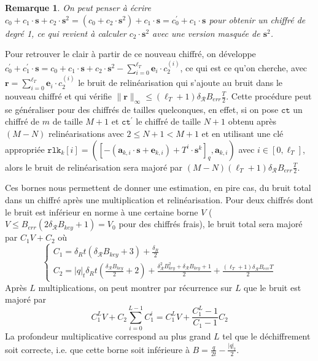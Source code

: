 \documentclass[11pt, headsepline, a4paper, fleqn, oneside]{article}
\newtheorem{rem}{Remarque}
\begin{document}
\begin{rem}
On peut penser à écrire $c_0 +c_1 \cdot\boldsymbol{s} + c_2 \cdot\boldsymbol{s}^2= (c_0 + c_2 \cdot\boldsymbol{s}^2) +c_1 \cdot\boldsymbol{s} = c_0 ^\prime +c_1 \cdot\boldsymbol{s}$ pour obtenir un chiffré de degré 1, ce qui revient à calculer $c_2 \cdot\boldsymbol{s}^2$ avec une version masquée de $\boldsymbol{s}^2$.
\end{rem}
Pour retrouver le clair à partir de ce nouveau chiffré, on développe $c_0 ^\prime + c_1 ^\prime \cdot\boldsymbol{s} = c_0 +c_1 \cdot\boldsymbol{s} + c_2 \cdot\boldsymbol{s}^2 - \sum_{i=0}^{\ell_T} \mathbf{e}_{i}\cdot c_2 ^{(i)}$, ce qui est ce qu'on cherche, avec $\boldsymbol{r} = \sum_{i=0}^{\ell_T} \mathbf{e}_{i}\cdot c_2 ^{(i)}$ le bruit de relinéarisation qui s'ajoute au bruit dans le nouveau chiffré et qui vérifie $\|\boldsymbol{r}\|_{\infty} \leq (\ell_T +1)\delta_\mathcal{R} B_{err}\frac{T}{2}$. Cette procédure peut se généraliser pour des chiffrés de tailles quelconques, en effet, si on pose $\texttt{ct}$ un chiffré de $m$ de taille $M+1$ et $\texttt{ct}^\prime$ le chiffré de taille $N+1$ obtenu après $(M-N)$ relinéarisations avec $2 \leq N+1<M+1$ et en utilisant une clé appropriée $\texttt{rlk}_{k}[i]=(\left[-\left(\mathbf{a}_{k, i}\cdot \boldsymbol{s}+\boldsymbol{e}_{k, i}\right)+T^{i}\cdot \boldsymbol{s}^{k}\right]_{q}, \mathbf{a}_{k, i})$ avec $i\in\left[0, \ell_{T}\right]$, alors le bruit de relinéarisation sera majoré par $(M-N)(\ell_T +1)\delta_\mathcal{R} B_{err}\frac{T}{2}$.

Ces bornes nous permettent de donner une estimation, en pire cas, du bruit total dans un chiffré après une multiplication et relinéarisation. Pour deux chiffrés dont le bruit est inférieur en norme à une certaine borne $V$ ($V\leq B_{err}(2\delta_{\mathcal{R}} B_{key} +1) =V_{0}$ pour des chiffrés frais), le bruit total sera majoré par $C_1 V + C_2$ où 
$$\left\{\begin{array}{l}{C_{1}=\delta_{R} t\left(\delta_{\mathcal{R}}B_{key}+3\right)+\frac{\delta_{R}}{2}} \\ {C_{2}=|q|_{t} \delta_{R} t\left(\frac{\delta_{\mathcal{R}}B_{key}}{2}+2\right)+\frac{\delta_{\mathcal{R}}^{2}B_{key}^{2}+\delta_{\mathcal{R}}B_{key}+1}{2}+\frac{(\ell_T +1)\delta_\mathcal{R} B_{err}T}{2}}\end{array}\right.$$
Après $L$ multiplications, on peut montrer par récurrence sur $L$ que le bruit est majoré par $$C_{1}^{L} V+C_{2} \sum_{i=0}^{L-1} C_{1}^{i} = C_{1}^{L} V+\dfrac{C_{1}^L - 1}{C_1 - 1} C_{2} $$ La profondeur multiplicative correspond au plus grand $L$ tel que le déchiffrement soit correcte, i.e. que cette borne soit inférieure à $B = \frac{q}{2t} - \frac{|q|_{t}}{2}$.
\end{document}
